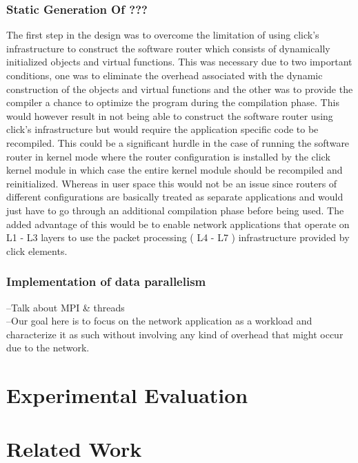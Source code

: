 \documentclass[conference]{IEEEtran}
\begin{document}
\subsubsection{Static Generation Of ???}
The first step in the design was to overcome the limitation of using click's infrastructure to construct the software router which consists of dynamically initialized objects and virtual functions. This was necessary due to two important conditions, one was to eliminate the overhead associated with the dynamic construction of the objects and virtual functions and the other was to provide the compiler a chance to optimize the program during the compilation phase. This would however result in not being able to construct the software router using click's infrastructure but would require the application specific code to be recompiled. This could be a significant hurdle in the case of running the software router in kernel mode where the router configuration is installed by the click kernel module in which case the entire kernel module should be recompiled and reinitialized. Whereas in user space this would not be an issue since routers of different configurations are basically treated as separate applications and would just have to go through an additional compilation phase before being used. The added advantage of this would be to enable network applications that operate on L1 - L3 layers to use the packet processing ( L4 - L7 ) infrastructure provided by click elements.

\subsubsection{Implementation of data parallelism}


--Talk about MPI \& threads\\

--Our goal here is to focus on the network application as a workload and characterize it as such without involving any kind of overhead that might occur due to the network.\\



\section{Experimental Evaluation}

\section{Related Work}
\end{document}
